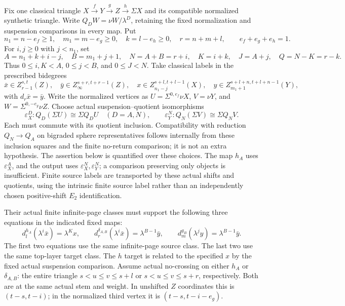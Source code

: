 \begin{definition}
\label{sem:ProofTools:mahowald-law}
Fix one classical triangle $X\xrightarrow fY\xrightarrow gZ\xrightarrow h\Sigma X$ and its compatible normalized synthetic triangle. Write $Q_DW=\nu W/\lambda^D$, retaining the fixed normalization and suspension comparisons in every map. Put
\[
n_1=n-e_f\geq1,\quad m_1=m-e_g\geq0,\quad k=l-e_h\geq0,\quad r=n+m+l,
\qquad e_f+e_g+e_h=1.
\]
For $i,j\geq0$ with $j<n_1$, set
\[
A=n_1+k+i-j,\quad B=m_1+j+1,\quad N=A+B=r+i,
\quad K=i+k,\quad J=A+j,\quad Q=N-K=r-k.
\]
Thus $0\leq i,K<A$, $0\leq j<B$, and $0\leq J<N$. Take classical labels in the prescribed bidegrees
\[
\bar x\in Z_{r-1}^{s,t}(Z),\quad \bar y\in Z_\infty^{s+r,t+r-1}(Z),\quad
x\in Z_{n_1-j}^{s+l,t+l-1}(X),\quad y\in Z_{m_1+1}^{s+l+n,t+l+n-1}(Y),
\]
with $d_r\bar x=\bar y$. Write the normalized vertices as $U=\Sigma^{0,e_f}\nu X$, $V=\nu Y$, and $W=\Sigma^{0,-e_g}\nu Z$. Choose actual suspension--quotient isomorphisms
\[
\varepsilon_X^D:Q_D(\Sigma U)\cong\Sigma Q_DU\quad(D=A,N),\qquad
\varepsilon_Y^N:Q_N(\Sigma V)\cong\Sigma Q_NV.
\]
Each must commute with its quotient inclusion. Compatibility with reduction $Q_N\to Q_A$ on bigraded sphere representatives follows internally from these inclusion squares and the finite no-return comparison; it is not an extra hypothesis. The assertion below is quantified over these choices. The map $h_A$ uses $\varepsilon_X^A$, and the output uses $\varepsilon_X^N,\varepsilon_Y^N$; a comparison preserving only objects is insufficient. Finite source labels are transported by these actual shifts and quotients, using the intrinsic finite source label rather than an independently chosen positive-shift $E_2$ identification.

Their actual finite infinite-page classes must support the following three equations in the indicated fixed maps:
\[
d_l^{h_A}(\lambda^i\bar x)=\lambda^Kx,\qquad
d_r^{\delta_{A,B}}(\lambda^i\bar x)=\lambda^{B-1}\bar y,\qquad
d_m^{g_B}(\lambda^jy)=\lambda^{B-1}\bar y.
\]
The first two equations use the same infinite-page source class. The last two use the same top-layer target class. The $h$ target is related to the specified $x$ by the fixed actual suspension comparison. Assume actual no-crossing on either $h_A$ or $\delta_{A,B}$: the entire triangle $s<u\leq v\leq s+l$ or $s<u\leq v\leq s+r$, respectively. Both are at the same actual stem and weight. In unshifted $Z$ coordinates this is $(t-s,t-i)$; in the normalized third vertex it is $(t-s,t-i-e_g)$.


\end{definition}
